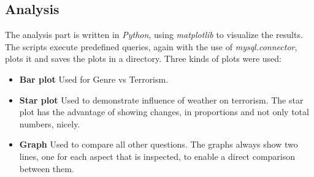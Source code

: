 \subsection{Analysis}
The analysis part is written in \emph{Python}, using \emph{matplotlib} to visualize the results. The scripts execute predefined queries, again with the use of \emph{mysql.connector}, plots it and saves the plots in a directory. Three kinds of plots were used:
\begin{itemize}
	\item \textbf{Bar plot} Used for Genre vs Terrorism.
	\item \textbf{Star plot} Used to demonstrate influence of weather on terrorism. The star plot has the advantage of showing changes, in proportions and not only total numbers, nicely.
	\item \textbf{Graph} Used to compare all other questions. The graphs always show two lines, one for each aspect that is inspected, to enable a direct comparison between them.
\end{itemize}

